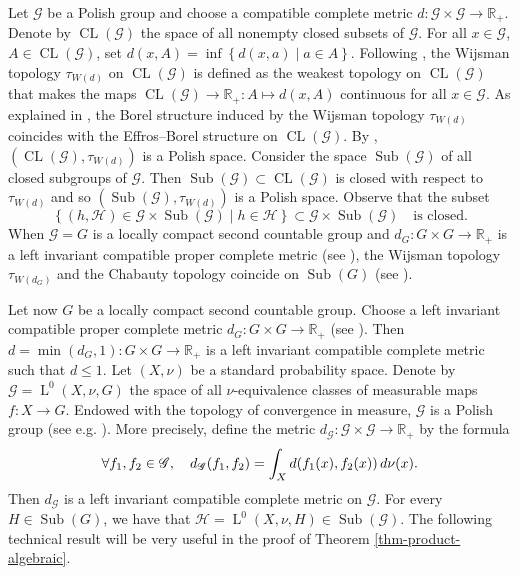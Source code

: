 \documentclass[11pt]{amsart}
\numberwithin{equation}{section}
\theoremstyle{plain}
\theoremstyle{definition}
\newcommand{\R}{\mathbb{R}}
\newcommand{\Sub}{\operatorname{Sub}}
\newcommand{\rL}{\operatorname{L}}
\newcommand{\CL}{\operatorname{CL}}
\begin{document}
Let $\mathscr G$ be a Polish group and choose a compatible complete metric $d : \mathscr G \times \mathscr G \to \R_+$. Denote by $\CL(\mathscr G)$ the space of all nonempty closed subsets of $\mathscr G$. For all $x\in \mathscr G$, $A \in \CL(\mathscr G)$, set $d(x, A) = \inf \left \{d(x, a) \mid a \in A\right \}$. Following \cite{Be90}, the Wijsman topology $\tau_{W(d)}$ on $\CL(\mathscr G)$ is defined as the weakest topology on $\CL(\mathscr G)$ that makes the maps $\CL(\mathscr G) \to \R_+ : A \mapsto d(x, A)$ continuous for all $x \in \mathscr G$. As explained in \cite{Be90}, the Borel structure induced by the Wijsman topology $\tau_{W(d)}$ coincides with the Effros--Borel structure on $\CL(\mathscr G)$. By \cite[Theorem 4.3]{Be90}, $(\CL(\mathscr G), \tau_{W(d)})$ is a Polish space. Consider the space $\Sub(\mathscr G)$ of all closed subgroups of $\mathscr G$. Then $\Sub(\mathscr G) \subset \CL(\mathscr G)$ is closed with respect to $\tau_{W(d)}$ and so $(\Sub(\mathscr G), \tau_{W(d)})$ is a Polish space. Observe that the subset
\begin{equation}\label{eq-closed}
\left \{ (h, \mathscr H) \in \mathscr G \times \Sub(\mathscr G) \mid h \in \mathscr H \right \} \subset \mathscr G \times \Sub(\mathscr G) \quad \text{is closed}.
\end{equation}
When $\mathscr G = G$ is a locally compact second countable group and $d_G : G \times G \to \R_+$ is a left invariant compatible proper complete metric (see \cite{St73}), the Wijsman topology $\tau_{W(d_G)}$ and the Chabauty topology coincide on $\Sub(G)$ (see \cite[Section 5]{BLLN89}).



Let now $G$ be a locally compact second countable group. Choose a left invariant compatible proper complete metric $d_{G} : G \times G \to \R_+$ (see \cite{St73}). Then $d = \min(d_G, 1) : G \times G \to \R_+$ is a left invariant compatible complete metric such that $d \leq 1$. Let $(X, \nu)$ be a standard probability space. Denote by $\mathscr G = \rL^0(X, \nu, G)$ the space of all $\nu$-equivalence classes of measurable maps $f : X \to G$. Endowed with the topology of convergence in measure, $\mathscr G$ is a Polish group (see e.g.\! \cite[Section 19]{Ke10}). More precisely, define the metric $d_{\mathscr G} : \mathscr G \times \mathscr G \to \R_+$ by the formula
$$\forall f_1, f_2 \in \mathscr G, \quad d_{\mathscr G}(f_1, f_2) = \int_X d(f_1(x), f_2(x)) \, {\rm d}\nu(x).$$
Then $d_{\mathscr G}$ is a left invariant compatible complete metric on $\mathscr G$. For every $H \in \Sub(G)$, we have that $\mathscr H = \rL^0(X, \nu, H) \in \Sub(\mathscr G)$. The following technical result will be very useful in the proof of Theorem \ref{thm-product-algebraic}.
\end{document}
